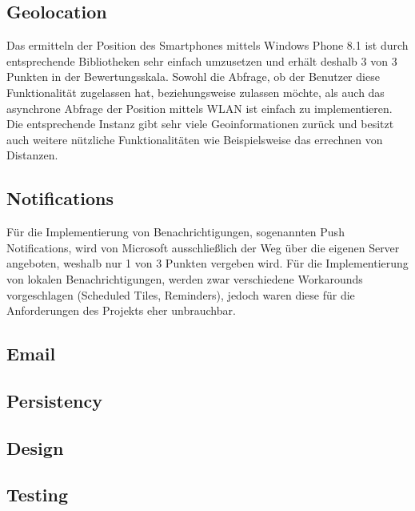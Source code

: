 \subsection{Geolocation}

Das ermitteln der Position des Smartphones mittels Windows Phone 8.1 ist durch entsprechende Bibliotheken sehr einfach umzusetzen und erhält deshalb 3 von 3 Punkten in der Bewertungsskala. Sowohl die Abfrage, ob der Benutzer diese Funktionalität zugelassen hat, beziehungsweise zulassen möchte, als auch das asynchrone Abfrage der Position mittels WLAN ist einfach zu implementieren. Die entsprechende Instanz gibt sehr viele Geoinformationen zurück und besitzt auch weitere nützliche Funktionalitäten wie Beispielsweise das errechnen von Distanzen.

\subsection{Notifications}

Für die Implementierung von Benachrichtigungen, sogenannten Push Notifications, wird von Microsoft ausschließlich der Weg über die eigenen Server angeboten, weshalb nur 1 von 3 Punkten vergeben wird. Für die Implementierung von lokalen Benachrichtigungen, werden zwar verschiedene Workarounds vorgeschlagen (Scheduled Tiles, Reminders), jedoch waren diese für die Anforderungen des Projekts eher unbrauchbar.

\subsection{Email}

\subsection{Persistency}

\subsection{Design}

\subsection{Testing}

